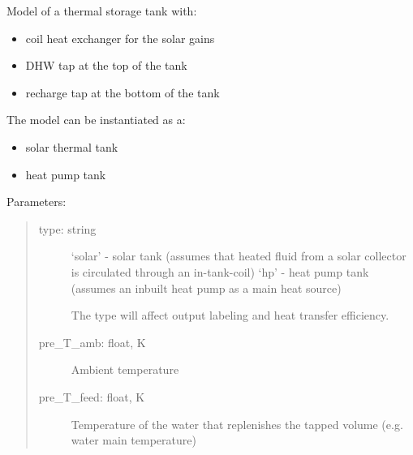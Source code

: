 \documentclass[letterpaper,10pt,english,openany]{sphinxmanual}
\begin{document}
\begin{fulllineitems}
\begin{fulllineitems}
\begin{quote}
\begin{description}
\end{description}
\end{quote}

\end{fulllineitems}


\begin{fulllineitems}
\label{\detokenize{source/mswh.system:mswh.system.components.Storage.thermal_tank}}
Model of a thermal storage tank with:
\begin{itemize}
\item {} 
coil heat exchanger for the solar gains

\item {} 
DHW tap at the top of the tank

\item {} 
recharge tap at the bottom of the tank

\end{itemize}

The model can be instantiated as a:
\begin{itemize}
\item {} 
solar thermal tank

\item {} 
heat pump tank

\end{itemize}

Parameters:
\begin{quote}
\begin{description}
\item[{type: string}] \leavevmode
‘solar’ - solar tank (assumes
that heated fluid from a solar collector is circulated
through an in-tank-coil)
‘hp’ - heat pump tank (assumes an inbuilt heat pump
as a main heat source)

The type will affect output labeling and heat transfer
efficiency.

\item[{pre\_T\_amb: float, K}] \leavevmode
Ambient temperature

\item[{pre\_T\_feed: float, K}] \leavevmode
Temperature of the water
that replenishes the tapped volume
(e.g. water main temperature)


\end{description}
\end{quote}
\end{fulllineitems}
\end{fulllineitems}
\end{document}
